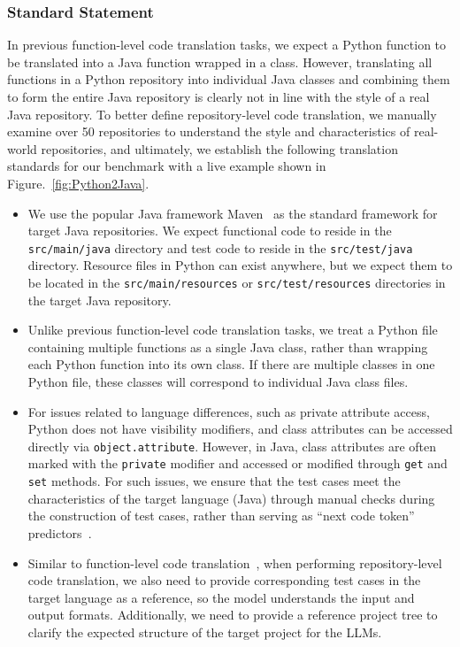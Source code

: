\subsubsection{Standard Statement}
In previous function-level code translation tasks, we expect a Python function to be translated into a Java function wrapped in a class. However, translating all functions in a Python repository into individual Java classes and combining them to form the entire Java repository is clearly not in line with the style of a real Java repository. To better define repository-level code translation, we manually examine over 50 repositories to understand the style and characteristics of real-world repositories, and ultimately, we establish the following translation standards for our benchmark with a live example shown in Figure.~\ref{fig:Python2Java}.
\begin{itemize}[left=10pt]
    \item We use the popular Java framework Maven~\cite{maven} as the standard framework for target Java repositories. We expect functional code to reside in the \texttt{src/main/java} directory and test code to reside in the \texttt{src/test/java} directory. Resource files in Python can exist anywhere, but we expect them to be located in the \texttt{src/main/resources} or \texttt{src/test/resources} directories in the target Java repository.
    \item Unlike previous function-level code translation tasks, we treat a Python file containing multiple functions as a single Java class, rather than wrapping each Python function into its own class. If there are multiple classes in one Python file, these classes will correspond to individual Java class files.
    \item For issues related to language differences, such as private attribute access, Python does not have visibility modifiers, and class attributes can be accessed directly via \texttt{object.attribute}. However, in Java, class attributes are often marked with the \texttt{private} modifier and accessed or modified through \texttt{get} and \texttt{set} methods. For such issues, we ensure that the test cases meet the characteristics of the target language (Java) through manual checks during the construction of test cases, rather than serving as “next code token” predictors~\cite{pan2024lost}.
    \item Similar to function-level code translation~\cite{liu2024your}, when performing repository-level code translation, we also need to provide corresponding test cases in the target language as a reference, so the model understands the input and output formats. Additionally, we need to provide a reference project tree to clarify the expected structure of the target project for the LLMs.
\end{itemize}

